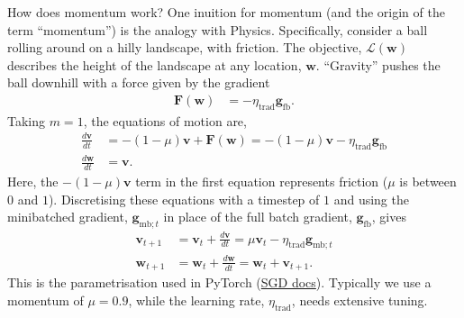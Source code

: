 \documentclass{article}
\newcommand{\dt}[2][]{\frac{d #1}{d #2}}
\newcommand{\0}{\mathbf{0}}
\newcommand{\g}{\mathbf{g}}
\newcommand{\mom}{\mathbf{v}}
\newcommand{\F}{\mathbf{F}}
\newcommand{\gfb}{\g_\text{fb}}
\newcommand{\gmbt}{\g_{\text{mb}; t}}
\newcommand{\w}{\mathbf{w}}
\renewcommand{\L}{\mathcal{L}}
\newcommand{\lrtrad}{\eta_\text{trad}}
\begin{document}
How does momentum work?
One inuition for momentum (and the origin of the term ``momentum'') is the analogy with Physics.
Specifically, consider a ball rolling around on a hilly landscape, with friction. 
The objective, $\L(\w)$ describes the height of the landscape at any location, $\w$.
``Gravity'' pushes the ball downhill with a force given by the gradient
\begin{align}
  \F(\w) &= - \lrtrad \gfb.
\end{align}
Taking $m=1$, the equations of motion are,
\begin{subequations}
\begin{align}
  \dt[\mom]{t} &= - (1-\mu) \mom + \F(\w) = - (1-\mu) \mom - \lrtrad \gfb\\
  \dt[\w]{t} &= \mom.
\end{align}
\end{subequations}
Here, the $- (1-\mu) \mom$ term in the first equation represents friction ($\mu$ is between $0$ and $1$).
Discretising these equations with a timestep of $1$ and using the minibatched gradient, $\gmbt$ in place of the full batch gradient, $\gfb$, gives
\begin{subequations}
\begin{align}
  \label{eq:sgdm:trad:mom}
  \mom_{t+1} &= \mom_t + \dt[\mom]{t} = \mu \mom_t - \lrtrad \gmbt\\
  \label{eq:sgdm:trad:w}
  \w_{t+1} &= \w_t + \dt[\w]{t} = \w_{t} + \mom_{t+1}.
\end{align}
\end{subequations}
This is the parametrisation used in PyTorch (\href{https://pytorch.org/docs/stable/generated/torch.optim.SGD.html}{SGD docs}). Typically we use a momentum of $\mu=0.9$, while the learning rate, $\lrtrad$, needs extensive tuning.
\end{document}
